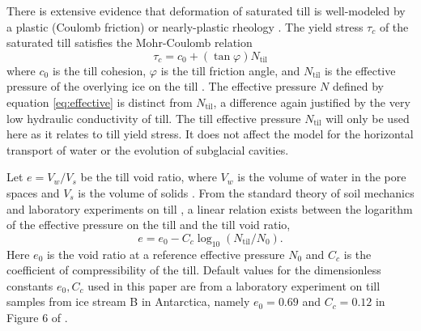 \documentclass[gmd]{copernicus}   %
\newcommand{\text}{\textrm}
\begin{document}
There is extensive evidence that deformation of saturated till is well-modeled by a plastic (Coulomb friction) or nearly-plastic rheology \citep{Hookeetal1997,SchoofTill,TrufferHarrisonEchelmeyer2000,Tulaczyketal2000}.  The yield stress $\tau_c$ of the saturated till satisfies the Mohr-Coulomb relation
\newcommand{\Ntil}{N_{\text{til}}}
\begin{equation}
\tau_c = c_0 + (\tan \varphi) \Ntil  \label{eq:mohrcoulomb}
\end{equation}
where $c_0$ is the till cohesion, $\varphi$ is the till friction angle, and $\Ntil$ is the effective pressure of the overlying ice on the till \citep{CuffeyPaterson}.  The effective pressure $N$ defined by equation \eqref{eq:effective} is distinct from $\Ntil$, a difference again justified by the very low hydraulic conductivity of till.  The till effective pressure $\Ntil$ will only be used here as it relates to till yield stress.  It does not affect the model for the horizontal transport of water or the evolution of subglacial cavities.

Let $e = V_w / V_s$ be the till void ratio, where $V_w$ is the volume of water in the pore spaces and $V_s$ is the volume of solids \citep{Tulaczyketal2000}.  From the standard theory of soil mechanics and laboratory experiments on till \citep{Hookeetal1997,Tulaczyketal2000}, a linear relation exists between the logarithm of the effective pressure on the till and the till void ratio,
\begin{equation}
e = e_0 - C_c \log_{10}\left(\Ntil / N_0\right).  \label{eq:voidpressure}
\end{equation}
Here $e_0$ is the void ratio at a reference effective pressure $N_0$ and $C_c$ is the coefficient of compressibility of the till.  Default values for the dimensionless constants $e_0,C_c$ used in this paper are from a laboratory experiment on till samples from ice stream B in Antarctica, namely $e_0=0.69$ and $C_c=0.12$ in Figure 6 of \cite{Tulaczyketal2000}.
\end{document}
